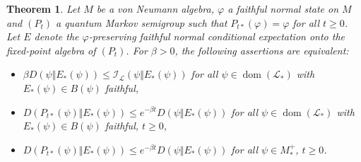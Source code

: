 \documentclass[12pt,a4paper]{amsart}
\newcommand{\1}{\mathds{1}}
\renewcommand{\phi}{\varphi}
\newcommand{\I}{\mathcal I}
\renewcommand{\L}{\mathcal L}
\newcommand{\dom}{\operatorname{dom}}
\theoremstyle{plain}
\newtheorem{theorem}[proposition]{Theorem}
\theoremstyle{definition}
\theoremstyle{remark}
\begin{document}
\begin{theorem}\label{thm:main}
Let $M$ be a von Neumann algebra, $\phi$ a faithful normal state on $M$ and $(P_t)$ a quantum Markov semigroup such that $P_{t\ast}(\phi)=\phi$ for all $t\geq 0$. Let $E$ denote the $\phi$-preserving faithful normal conditional expectation onto the fixed-point algebra of $(P_t)$. For $\beta>0$, the following assertions are equivalent:
\begin{itemize}
\item[(i)] $\beta D(\psi\Vert E_\ast(\psi))\leq \I_\L(\psi\Vert E_\ast(\psi))$ for all $\psi\in \dom(\L_\ast)$ with $E_\ast(\psi)\in B(\psi)$ faithful,
\item[(ii)]$D(P_{t\ast}(\psi)\Vert E_\ast(\psi))\leq e^{-\beta t}D(\psi\Vert E_\ast(\psi))$ for all $\psi\in \dom(\L_\ast)$ with $E_\ast(\psi)\in B(\psi)$ faithful, $t\geq 0$,
\item[(iii)]$D(P_{t\ast}(\psi)\Vert E_\ast(\psi))\leq e^{-\beta t}D(\psi\Vert E_\ast(\psi))$ for all $\psi\in M_\ast^+$, $t\geq 0$.
\end{itemize}
\end{theorem}
\end{document}
